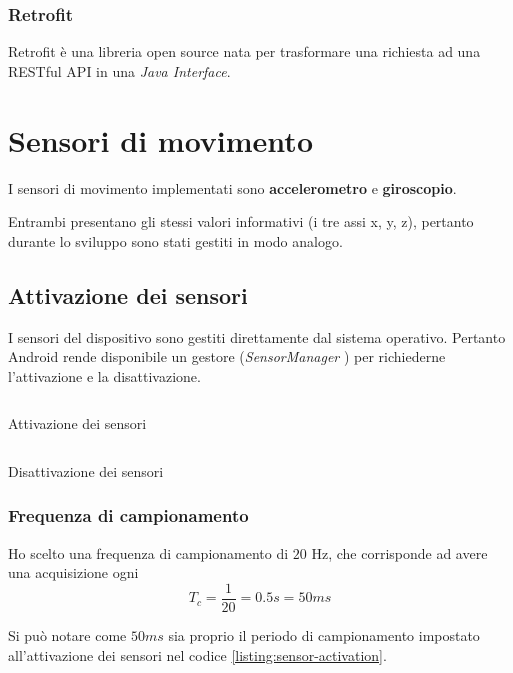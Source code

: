 \subsubsection{Retrofit}
Retrofit \cite{retrofit} è una libreria open source nata per trasformare una richiesta ad una RESTful API 
in una \textit{Java Interface}.


\newpage
\section{Sensori di movimento}
I sensori di movimento implementati sono \textbf{accelerometro} e \textbf{giroscopio}.

Entrambi presentano gli stessi valori informativi (i tre assi x, y, z), pertanto durante lo sviluppo sono stati gestiti in modo analogo.

\subsection{Attivazione dei sensori}
I sensori del dispositivo sono gestiti direttamente dal sistema operativo. Pertanto Android rende disponibile 
un gestore (\textit{SensorManager} \cite{sensor_manager}) per richiederne l'attivazione e la disattivazione.

\begin{listing}[H] 
    \inputminted[frame=single,framesep=10pt]{java}{assets/snippets/app/sensors/start_sensors.java}
    \caption{Attivazione dei sensori}
    \label{listing:sensor-activation}
\end{listing}
\begin{listing}[H] 
    \inputminted[frame=single,framesep=10pt]{java}{assets/snippets/app/sensors/stop_sensors.java}
    \caption{Disattivazione dei sensori}
    \label{listing:sensor-deactivation}
\end{listing}

\vfill
\subsubsection{Frequenza di campionamento}
\label{paragraph:sampling_rate}
Ho scelto una frequenza di campionamento di $20$ Hz, che corrisponde ad avere una acquisizione 
ogni 
$$T_c = \frac{1}{20} = 0.5 s = 50ms $$

\vspace{5mm} %
\noindent Si può notare come $50ms$ sia proprio il periodo di campionamento impostato 
all'attivazione dei sensori nel codice \ref{listing:sensor-activation}.


